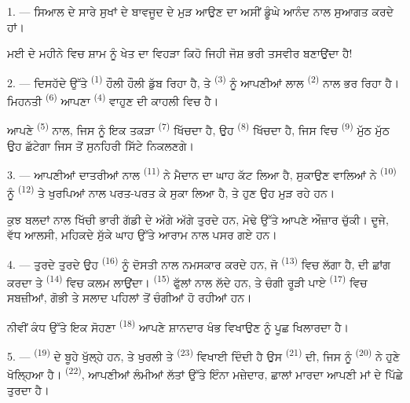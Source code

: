 \VUsaut{4.0mm}

1. --- ਸਿਆਲ ਦੇ ਸਾਰੇ ਸੁਖਾਂ ਦੇ ਬਾਵਜੂਦ  ਦੇ ਮੁੜ ਆਉਣ ਦਾ ਅਸੀਂ ਡੂੰਘੇ
ਆਨੰਦ ਨਾਲ ਸੁਆਗਤ ਕਰਦੇ ਹਾਂ।

ਮਈ ਦੇ ਮਹੀਨੇ ਵਿਚ ਸ਼ਾਮ ਨੂੰ ਖੇਤ ਦਾ ਵਿਹੜਾ ਕਿਹੋ ਜਿਹੀ ਜੋਸ਼ ਭਰੀ ਤਸਵੀਰ ਬਣਾਉਂਦਾ ਹੈ!

2. --- ਦਿਸਹੱਦੇ ਉੱਤੇ  \textsuperscript{(1)} ਹੌਲੀ ਹੌਲੀ ਡੁੱਬ ਰਿਹਾ ਹੈ, ਤੇ
 \textsuperscript{(3)} ਨੂੰ ਆਪਣੀਆਂ ਲਾਲ 
\textsuperscript{(2)} ਨਾਲ ਭਰ ਰਿਹਾ ਹੈ। ਮਿਹਨਤੀ  \textsuperscript{(6)}
ਆਪਣਾ  \textsuperscript{(4)} ਵਾਹੁਣ ਦੀ ਕਾਹਲੀ ਵਿਚ ਹੈ।

ਆਪਣੇ  \textsuperscript{(5)} ਨਾਲ, ਜਿਸ ਨੂੰ ਇਕ ਤਕੜਾ 
\textsuperscript{(7)} ਖਿੱਚਦਾ ਹੈ, ਉਹ  \textsuperscript{(8)} ਖਿੱਚਦਾ ਹੈ,
ਜਿਸ ਵਿਚ  \textsuperscript{(9)} ਮੁੱਠ ਮੁੱਠ ਉਹ 
ਛੱਟੇਗਾ ਜਿਸ ਤੋਂ ਸੁਨਹਿਰੀ ਸਿੱਟੇ ਨਿਕਲਣਗੇ।

3. --- ਆਪਣੀਆਂ ਦਾਤਰੀਆਂ ਨਾਲ  \textsuperscript{(11)} ਨੇ
ਮੈਦਾਨ ਦਾ ਘਾਹ ਕੱਟ ਲਿਆ ਹੈ, ਸੁਕਾਉਣ ਵਾਲਿਆਂ ਨੇ 
\textsuperscript{(10)} ਨੂੰ  \textsuperscript{(12)} ਤੇ ਖੁਰਪਿਆਂ ਨਾਲ
ਪਰਤ-ਪਰਤ ਕੇ ਸੁਕਾ ਲਿਆ ਹੈ, ਤੇ ਹੁਣ ਉਹ ਮੁੜ ਰਹੇ ਹਨ।

ਕੁਝ ਬਲਦਾਂ ਨਾਲ ਖਿੱਚੀ ਭਾਰੀ ਗੱਡੀ ਦੇ ਅੱਗੇ ਅੱਗੇ ਤੁਰਦੇ ਹਨ, ਮੋਢੇ ਉੱਤੇ ਆਪਣੇ ਔਜ਼ਾਰ ਚੁੱਕੀ।
ਦੂਜੇ, ਵੱਧ ਆਲਸੀ, ਮਹਿਕਦੇ ਸੁੱਕੇ ਘਾਹ ਉੱਤੇ ਆਰਾਮ ਨਾਲ ਪਸਰ ਗਏ ਹਨ।

4. --- ਤੁਰਦੇ ਤੁਰਦੇ ਉਹ  \textsuperscript{(16)} ਨੂੰ ਦੋਸਤੀ ਨਾਲ ਨਮਸਕਾਰ
ਕਰਦੇ ਹਨ, ਜੋ  \textsuperscript{(13)} ਵਿਚ ਲੱਗਾ ਹੈ,  ਦੀ ਛਾਂਗ ਕਰਦਾ ਤੇ  \textsuperscript{(14)} ਵਿਚ
ਕਲਮ ਲਾਉਂਦਾ।  \textsuperscript{(15)} ਫੁੱਲਾਂ ਨਾਲ ਲੱਦੇ ਹਨ,
ਤੇ ਚੰਗੀ ਰੂੜੀ ਪਾਏ  \textsuperscript{(17)} ਵਿਚ ਸਬਜ਼ੀਆਂ, ਗੋਭੀ ਤੇ
ਸਲਾਦ ਪਹਿਲਾਂ ਤੋਂ ਚੰਗੀਆਂ ਹੋ ਰਹੀਆਂ ਹਨ।

ਨੀਵੀਂ ਕੰਧ ਉੱਤੇ ਇਕ ਸੋਹਣਾ  \textsuperscript{(18)} ਆਪਣੇ ਸ਼ਾਨਦਾਰ ਖੰਭ
ਵਿਖਾਉਣ ਨੂੰ ਪੂਛ ਖਿਲਾਰਦਾ ਹੈ।

\VUsaut{3.0mm}

5. ---  \textsuperscript{(19)} ਦੇ ਬੂਹੇ ਖੁੱਲ੍ਹੇ ਹਨ, ਤੇ ਖੁਰਲੀ ਤੇ
 \textsuperscript{(23)} ਵਿਖਾਈ ਦਿੰਦੀ ਹੈ ਉਸ 
\textsuperscript{(21)} ਦੀ, ਜਿਸ ਨੂੰ  \textsuperscript{(20)} ਨੇ ਹੁਣੇ
ਖੋਲ੍ਹਿਆ ਹੈ।  \textsuperscript{(22)}, ਆਪਣੀਆਂ ਲੰਮੀਆਂ ਲੱਤਾਂ ਉੱਤੇ ਇੰਨਾ
ਮਜ਼ੇਦਾਰ, ਛਾਲਾਂ ਮਾਰਦਾ ਆਪਣੀ ਮਾਂ ਦੇ ਪਿੱਛੇ ਤੁਰਦਾ ਹੈ।

